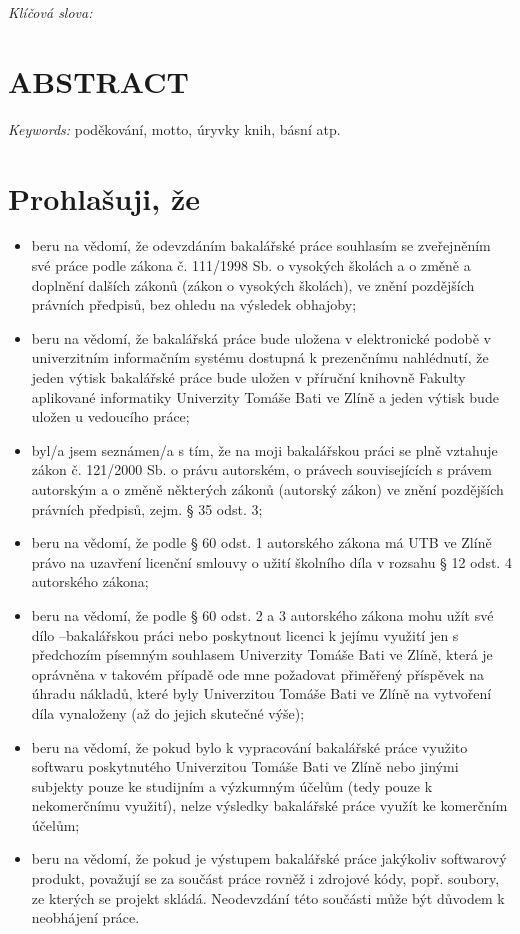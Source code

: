 \documentclass[a4paper,12pt]{article}
\newcommand{\nmm}[1]{\section*{#1}} %
\newcommand{\nns}[1]{\section*{\uppercase{#1}}}		%
\begin{document}
\emph{Klíčová slova:}

\vspace{3cm}

\nns{\uppercase{Abstract}}

\vspace{1cm}

\emph{Keywords:}
\clearpage
\thispagestyle{empty}
poděkování, motto, úryvky knih, básní atp.
\clearpage
\thispagestyle{empty}
\clearpage
\nmm{Prohlašuji, že}
\begin{itemize}\fontsize{10}{1}
\normalsize
\item beru na vědomí, že odevzdáním bakalářské práce souhlasím se zveřejněním své práce podle zákona č. 111/1998 Sb. o vysokých školách a o změně a doplnění dalších zákonů (zákon o vysokých školách), ve znění pozdějších právních předpisů, bez ohledu na výsledek obhajoby;
\item beru na vědomí, že bakalářská práce bude uložena v elektronické podobě v univerzitním informačním systému dostupná k prezenčnímu nahlédnutí, že jeden výtisk bakalářské práce bude uložen v příruční knihovně Fakulty aplikované informatiky Univerzity Tomáše Bati ve Zlíně a jeden výtisk bude uložen u vedoucího práce; 
\item byl/a jsem seznámen/a s tím, že na moji bakalářskou práci se plně vztahuje zákon č. 121/2000 Sb. o právu autorském, o právech souvisejících s právem autorským a o změně některých zákonů (autorský zákon) ve znění pozdějších právních předpisů, zejm. § 35 odst. 3;
\item beru na vědomí, že podle § 60 odst. 1 autorského zákona má UTB ve Zlíně právo na uzavření licenční smlouvy o užití školního díla v rozsahu § 12 odst. 4 autorského zákona;
\item beru na vědomí, že podle § 60 odst. 2 a 3 autorského zákona mohu užít své dílo –bakalářskou práci nebo poskytnout licenci k jejímu využití jen s předchozím písemným souhlasem Univerzity Tomáše Bati ve Zlíně, která je oprávněna v takovém případě ode mne požadovat přiměřený příspěvek na úhradu nákladů, které byly Univerzitou Tomáše Bati ve Zlíně na vytvoření díla vynaloženy (až do jejich skutečné výše);
\item beru na vědomí, že pokud bylo k vypracování bakalářské práce
využito softwaru poskytnutého Univerzitou Tomáše Bati ve Zlíně nebo jinými
subjekty pouze ke studijním a výzkumným účelům (tedy pouze k nekomerčnímu
využití), nelze výsledky bakalářské práce využít ke komerčním
účelům;
\item beru na vědomí, že pokud je výstupem bakalářské práce jakýkoliv softwarový produkt, považují se za součást práce rovněž i zdrojové kódy, popř. soubory, ze kterých se projekt skládá. Neodevzdání této součásti může být důvodem k neobhájení práce.
\end{itemize}
\end{document}
